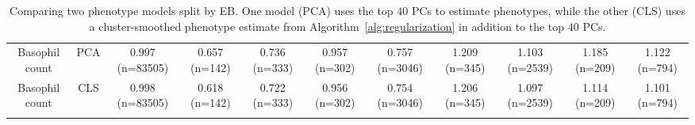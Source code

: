 \begin{landscape}
\begin{table}[!htbp]
\begin{tabular}{ ccccccccccc}
Basophil count & PCA & 0.997 (n=83505) & 0.657 (n=142) & 0.736 (n=333) & 0.957 (n=302) & 0.757 (n=3046) & 1.209 (n=345) & 1.103 (n=2539) & 1.185 (n=209) & 1.122 (n=794) \\ 
Basophil count & CLS & 0.998 (n=83505) & 0.618 (n=142) & 0.722 (n=333) & 0.956 (n=302) & 0.754 (n=3046) & 1.206 (n=345) & 1.097 (n=2539) & 1.114 (n=209) & 1.101 (n=794) \\ 
\hline \\[-1.8ex] 
\end{tabular} 
\caption[Comparing phenotype models by EB (1)]{Comparing two phenotype models split by EB. One model (PCA) uses the top $40$ PCs to estimate phenotypes, while the other (CLS) uses a cluster-smoothed phenotype estimate from Algorithm~\ref{alg:regularization} in addition to the top $40$ PCs.}
  \label{table:supp_mse1} 
\end{table} 

\end{landscape}

\clearpage

